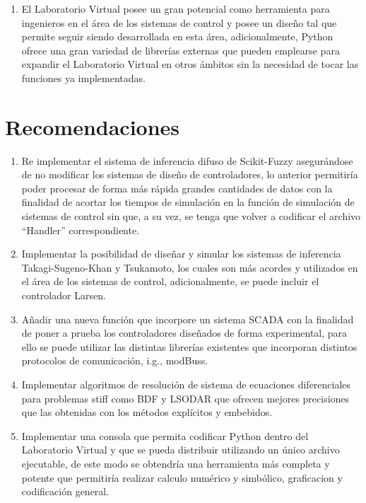 \begin{enumerate}[leftmargin=15pt]
        \item El Laboratorio Virtual posee un gran potencial como herramienta para ingenieros en el área de los sistemas de control y posee un diseño tal que permite seguir siendo desarrollada en esta área, adicionalmente, Python ofrece una gran variedad de librerías externas que pueden emplearse para expandir el Laboratorio Virtual en otros ámbitos sin la necesidad de tocar las funciones ya implementadas.
    \end{enumerate}

\section{Recomendaciones}

\begin{enumerate}[leftmargin=15pt]
    \setlength\itemsep{10pt}    
    \item Re implementar el sistema de inferencia difuso de Scikit-Fuzzy asegurándose de no modificar los sistemas de diseño de controladores, lo anterior permitiría poder procesar de forma más rápida grandes cantidades de datos con la finalidad de acortar los tiempos de simulación en la función de simulación de sistemas de control sin que, a su vez, se tenga que volver a codificar el archivo \enquote{Handler} correspondiente.
    
    \item Implementar la posibilidad de diseñar y simular los sistemas de inferencia Takagi-Sugeno-Khan y Tsukamoto, los cuales son más acordes y utilizados en el área de los sistemas de control, adicionalmente, se puede incluir el controlador Larsen.
    
    \item Añadir una nueva función que incorpore un sistema SCADA con la finalidad de poner a prueba los controladores diseñados de forma experimental, para ello se puede utilizar las distintas librerías existentes que incorporan distintos protocolos de comunicación, i.g., modBuss.
    
    \item Implementar algoritmos de resolución de sistema de ecuaciones diferenciales para problemas stiff como BDF y LSODAR que ofrecen mejores precisiones que las obtenidas con los métodos explícitos y embebidos.
    
    \item Implementar una consola que permita codificar Python dentro del Laboratorio Virtual y que se pueda distribuir utilizando un único archivo ejecutable, de este modo se obtendría una herramienta más completa y potente que permitiría realizar calculo numérico y simbólico, graficacion y codificación general.  

\end{enumerate}